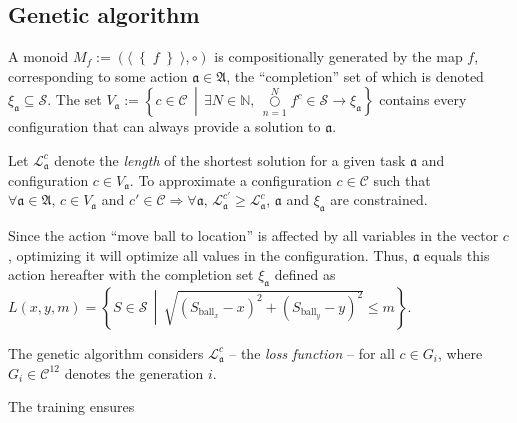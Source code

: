 \subsection{Genetic algorithm}
A monoid \(M_f:=\left(\langle \right\{ f \left\} \rangle,\circ\right)\) is compositionally generated by the map \(f\), corresponding to some action \(\mathfrak{a}\in\mathfrak{A}\), the ``completion'' set of which is denoted \(\xi_\mathfrak{a}\subseteq\mathcal{S}\). The set \(V_\mathfrak{a} := \left\{ c\in\mathcal{C} \,\middle|\, \exists N\in\mathbb{N},\, \overset{N}{\underset{n=1}\bigcirc} f^c \in \mathcal{S} \to \xi_\mathfrak{a} \right\}\) contains every configuration that can always provide a solution to \(\mathfrak{a}\).


Let \(\mathscr{L}^c_\mathfrak{a}\) denote the \textit{length} of the shortest solution for a given task \(\mathfrak{a}\) and configuration \(c\in V_\mathfrak{a}\). To approximate a configuration \(c\in\mathcal{C}\) such that \( \forall \mathfrak{a}\in\mathfrak{A},\, c\in V_\mathfrak{a} \) and \(c'\in\mathcal{C} \Rightarrow \forall \mathfrak{a},\, \mathscr{L}^{c'}_\mathfrak{a} \ge \mathscr{L}^{c}_\mathfrak{a}\), \(\mathfrak{a}\) and \(\xi_\mathfrak{a}\) are constrained.

Since the action ``move ball to location'' is affected by all variables in the vector \(c\), optimizing it will optimize all values in the configuration. Thus, \(\mathfrak{a}\) equals this action hereafter with the completion set \(\xi_\mathfrak{a}\) defined as \(L(x,y,m) = \left\{ S \in \mathcal{S} \,\middle|\, \sqrt{ \left(S_{\text{ball}_x} - x\right)^2 + \left(S_{\text{ball}_y} - y\right)^2 } \le m \right\}\).

The genetic algorithm considers \(\mathscr{L}^{c}_\mathfrak{a}\) -- the \textit{loss function} -- for all \(c\in G_i\), where \(G_i\in\mathcal{C}^{12}\) denotes the generation \(i\).

The training ensures \(\)
